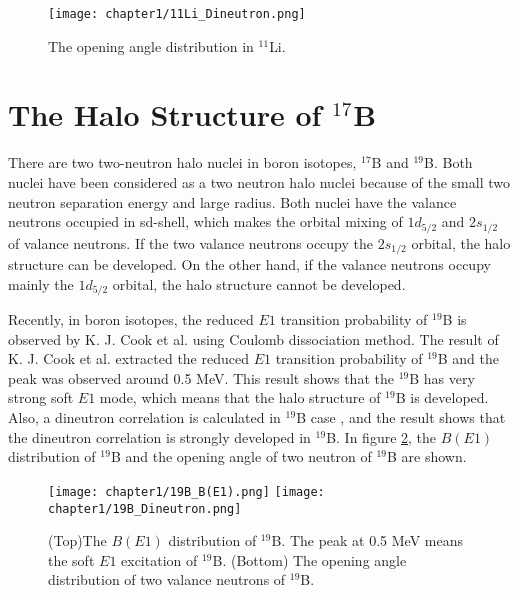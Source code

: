 \begin{figure}
    \centering
    \texttt{[image: chapter1/11Li\_Dineutron.png]}
    \caption{The opening angle distribution in $^{11}$Li. \cite{Hagino05}}
    \label{fig:dineutron}
\end{figure}


\section{The Halo Structure of ${}^{17}$B}
There are two two-neutron halo nuclei in boron isotopes, $^{17}$B and $^{19}$B. Both nuclei have been considered as a two neutron halo nuclei because of the small two neutron separation energy and large radius\cite{Suzuki99}. Both nuclei have the valance neutrons occupied in sd-shell, which makes the orbital mixing of $1d_{5/2}$ and $2s_{1/2}$ of valance neutrons. If the two valance neutrons occupy the $2s_{1/2}$ orbital, the halo structure can be developed. On the other hand, if the valance neutrons occupy mainly the $1d_{5/2}$ orbital, the halo structure cannot be developed.

Recently, in boron isotopes, the reduced $E1$ transition probability of $^{19}$B is observed by K. J. Cook et al.\cite{KJCook} using Coulomb dissociation method. The result of K. J. Cook et al. extracted the reduced $E1$ transition probability of $^{19}$B and the peak was observed around 0.5 MeV. This result shows that the $^{19}$B has very strong soft $E1$ mode, which means that the halo structure of $^{19}$B is developed. Also, a dineutron correlation is calculated in $^{19}$B case \cite{Hagino05}, and the result shows that the dineutron correlation is strongly developed in $^{19}$B. In figure \ref{fig:19B}, the $B(E1)$ distribution of $^{19}$B and the opening angle of two neutron of $^{19}$B are shown. 

\begin{figure}[t]
    \centering
    \texttt{[image: chapter1/19B\_B(E1).png]}
    \texttt{[image: chapter1/19B\_Dineutron.png]}    
    \caption[The B(E1) distribution of $^{19}$B\cite{KJCook} and the opening angle distribution of $^{19}$B\cite{Hagino05}]{(Top)The $B(E1)$ distribution of $^{19}$B. The peak at 0.5 MeV means the soft $E1$ excitation of $^{19}$B\cite{KJCook}. (Bottom) The opening angle distribution of two valance neutrons of $^{19}$B\cite{Hagino05}.}
    \label{fig:19B}
\end{figure}

